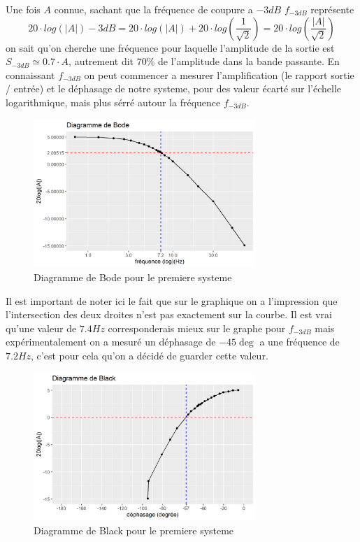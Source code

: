 \documentclass[12pt, a4paper]{report}
\begin{document}
Une fois $A$ connue, sachant que la fréquence de 
coupure a $-3 dB$ $f_{-3dB}$ représente
\[
    20 \cdot log(\left | A \right|) - 3dB =  20 \cdot log\left(\left | A \right|\right) + 20 \cdot log \left( \frac{1}{\sqrt{2}} \right)
    = 20 \cdot log \left( \frac{\left| A \right|}{\sqrt{2}} \right)
\]
on sait qu'on cherche une fréquence pour laquelle l'amplitude de la sortie est $S_{-3dB} \simeq  0.7 \cdot A$, autrement dit $70\%$ de l'amplitude 
dans la bande passante. En connaissant $f_{-3dB}$ on peut commencer a mesurer l'amplification (le rapport sortie / entrée) et le 
déphasage de notre systeme, pour des valeur écarté sur l'échelle logarithmique, mais plus sérré
autour la fréquence $f_{-3dB}$. \par

\begin{figure}[h]
    \centering
    \includegraphics[width=0.75\textwidth]{bode1.png}
    \caption{Diagramme de Bode pour le premiere systeme}
    \label{fig:diagBode1}
\end{figure}

Il est important de noter ici le fait que sur le graphique on a l'impression que
l'intersection des deux droites n'est pas exactement sur la courbe. Il est vrai 
qu'une valeur de $7.4 Hz$ corresponderais mieux sur le graphe pour $f_{-3dB}$ mais 
expérimentalement on a mesuré un déphasage de $-45 \deg$ a une fréquence de $7.2 Hz$, c'est pour 
cela qu'on a décidé de guarder cette valeur.

\begin{figure}[h]
    \centering
    \includegraphics[width=0.75\textwidth]{black1.png}
    \caption{Diagramme de Black pour le premiere systeme}
    \label{fig:diagBlack1}
\end{figure}
\end{document}
